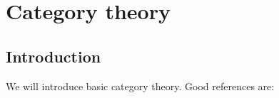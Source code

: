 

\section{Category theory}

\subsection{Introduction}



 

We will introduce basic category theory. Good references are: \cite{MacLaneSaunders1998Cftw,rotman2008introduction}


